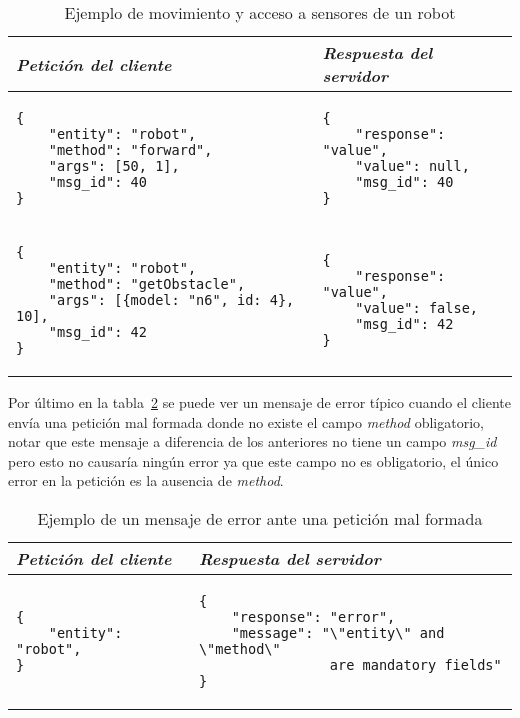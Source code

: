 \begin{table}
    \centering
    \begin{tabular}{|m{}|m{}|}
        \hline
        \textit{Petición del cliente} & \textit{Respuesta del servidor} \\
        \hline
\begin{Verbatim}[fontsize=\footnotesize]
{
    "entity": "robot",
    "method": "forward",
    "args": [50, 1],
    "msg_id": 40
}
\end{Verbatim}
&
\begin{Verbatim}[fontsize=\footnotesize]
{
    "response": "value",
    "value": null,
    "msg_id": 40
}
\end{Verbatim}
\\
\hline
\begin{Verbatim}[fontsize=\footnotesize]
{
    "entity": "robot",
    "method": "getObstacle",
    "args": [{model: "n6", id: 4}, 10],
    "msg_id": 42
}
\end{Verbatim}
&
\begin{Verbatim}[fontsize=\footnotesize]
{
    "response": "value",
    "value": false,
    "msg_id": 42
}
\end{Verbatim}
\\
\hline
    \end{tabular}
    \caption{Ejemplo de movimiento y acceso a sensores de un robot}
    \label{tbl:ej_movimiento_y_sensor}
\end{table}

Por último en la tabla~\ref{tbl:ej_error} se puede ver un mensaje de error
típico cuando el cliente envía una petición mal formada donde no existe
el campo \textit{method} obligatorio, notar que este mensaje a diferencia
de los anteriores no tiene un campo \textit{msg\_id} pero esto no causaría
ningún error ya que este campo no es obligatorio, el único error en la
petición es la ausencia de \textit{method}.

\begin{table}
    \centering
    \begin{tabular}{|m{}|m{}|}
        \hline
        \textit{Petición del cliente} & \textit{Respuesta del servidor} \\
        \hline
\begin{Verbatim}[fontsize=\footnotesize]
{
    "entity": "robot",
}
\end{Verbatim}
&
\begin{Verbatim}[fontsize=\footnotesize]
{
    "response": "error",
    "message": "\"entity\" and \"method\"
                are mandatory fields"
}
\end{Verbatim}
\\
\hline
    \end{tabular}
    \caption{Ejemplo de un mensaje de error ante una petición mal formada}
    \label{tbl:ej_error}
\end{table}

